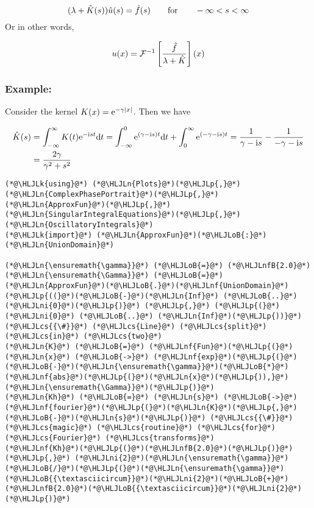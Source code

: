 \documentclass[12pt,landscape]{article}
\newcommand{\HLJLk}[1]{\textcolor[RGB]{148,91,176}{\textbf{#1}}}
\newcommand{\HLJLn}[1]{#1}
\newcommand{\HLJLnf}[1]{\textcolor[RGB]{66,102,213}{#1}}
\newcommand{\HLJLnfB}[1]{\textcolor[RGB]{59,151,46}{#1}}
\newcommand{\HLJLni}[1]{\textcolor[RGB]{59,151,46}{#1}}
\newcommand{\HLJLoB}[1]{\textcolor[RGB]{102,102,102}{\textbf{#1}}}
\newcommand{\HLJLp}[1]{#1}
\newcommand{\HLJLcs}[1]{\textcolor[RGB]{153,153,119}{\textit{#1}}}
\def\qqfor{\qquad\hbox{for}\qquad}
\def\D{ {\rm d} }
\def\I{ {\rm i} }
\def\E{ {\rm e} }
\def\dt{\D t}
\begin{document}
{\[
(\lambda + \hat K(s)) \hat u(s) = \hat f(s) \qqfor -\infty < s < \infty
\]
Or in other words,

\[
u(x) = {\cal F}^{-1} \left[{\hat f \over \lambda + \hat K }\right](x)
\]
\subsubsection{Example:}
Consider the kernel $K(x) = \E^{-\gamma |x|}$. Then we have


\begin{align*}
\hat K(s) &= \int_{-\infty}^\infty K(t) \E^{-\I s t} \dt = \int_{-\infty}^0 \E^{( \gamma - \I s ) t} \dt  + \int_0^\infty \E^{(-\gamma - \I s ) t} = {1 \over  \gamma - \I s} - {1 \over -\gamma - \I s } \\
&= {2\gamma \over \gamma^2 + s^2}
\end{align*}

\begin{lstlisting}
(*@\HLJLk{using}@*) (*@\HLJLn{Plots}@*)(*@\HLJLp{,}@*) (*@\HLJLn{ComplexPhasePortrait}@*)(*@\HLJLp{,}@*) (*@\HLJLn{ApproxFun}@*)(*@\HLJLp{,}@*) (*@\HLJLn{SingularIntegralEquations}@*)(*@\HLJLp{,}@*) (*@\HLJLn{OscillatoryIntegrals}@*)
(*@\HLJLk{import}@*) (*@\HLJLn{ApproxFun}@*)(*@\HLJLoB{:}@*) (*@\HLJLn{UnionDomain}@*)

(*@\HLJLn{\ensuremath{\gamma}}@*) (*@\HLJLoB{=}@*) (*@\HLJLnfB{2.0}@*)
(*@\HLJLn{\ensuremath{\Gamma}}@*) (*@\HLJLoB{=}@*) (*@\HLJLn{ApproxFun}@*)(*@\HLJLoB{.}@*)(*@\HLJLnf{UnionDomain}@*)(*@\HLJLp{((}@*)(*@\HLJLoB{-}@*)(*@\HLJLn{Inf}@*) (*@\HLJLoB{..}@*) (*@\HLJLni{0}@*)(*@\HLJLp{)}@*) (*@\HLJLp{,}@*) (*@\HLJLp{(}@*)(*@\HLJLni{0}@*) (*@\HLJLoB{..}@*) (*@\HLJLn{Inf}@*)(*@\HLJLp{))}@*) (*@\HLJLcs{{\#}}@*) (*@\HLJLcs{Line}@*) (*@\HLJLcs{split}@*) (*@\HLJLcs{in}@*) (*@\HLJLcs{two}@*)
(*@\HLJLn{K}@*) (*@\HLJLoB{=}@*) (*@\HLJLnf{Fun}@*)(*@\HLJLp{(}@*)(*@\HLJLn{x}@*) (*@\HLJLoB{->}@*) (*@\HLJLnf{exp}@*)(*@\HLJLp{(}@*)(*@\HLJLoB{-}@*)(*@\HLJLn{\ensuremath{\gamma}}@*)(*@\HLJLoB{*}@*)(*@\HLJLnf{abs}@*)(*@\HLJLp{(}@*)(*@\HLJLn{x}@*)(*@\HLJLp{)),}@*) (*@\HLJLn{\ensuremath{\Gamma}}@*)(*@\HLJLp{)}@*)
(*@\HLJLn{Kh}@*) (*@\HLJLoB{=}@*) (*@\HLJLn{s}@*) (*@\HLJLoB{->}@*) (*@\HLJLnf{fourier}@*)(*@\HLJLp{(}@*)(*@\HLJLn{K}@*)(*@\HLJLp{,}@*) (*@\HLJLoB{-}@*)(*@\HLJLn{s}@*)(*@\HLJLp{)}@*) (*@\HLJLcs{{\#}}@*) (*@\HLJLcs{magic}@*) (*@\HLJLcs{routine}@*) (*@\HLJLcs{for}@*) (*@\HLJLcs{Fourier}@*) (*@\HLJLcs{transforms}@*)
(*@\HLJLnf{Kh}@*)(*@\HLJLp{(}@*)(*@\HLJLnfB{2.0}@*)(*@\HLJLp{)}@*) (*@\HLJLp{,}@*) (*@\HLJLni{2}@*)(*@\HLJLn{\ensuremath{\gamma}}@*)(*@\HLJLoB{/}@*)(*@\HLJLp{(}@*)(*@\HLJLn{\ensuremath{\gamma}}@*)(*@\HLJLoB{{\textasciicircum}}@*)(*@\HLJLni{2}@*)(*@\HLJLoB{+}@*)(*@\HLJLnfB{2.0}@*)(*@\HLJLoB{{\textasciicircum}}@*)(*@\HLJLni{2}@*)(*@\HLJLp{)}@*)
\end{lstlisting}

}
\end{document}
